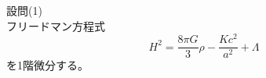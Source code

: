 \documentclass[unicode,a4paper,10pt]{ltjsarticle}
\begin{document}
\maketitle

設問(1)\\

フリードマン方程式
\begin{equation}
  H^2
  =
  \frac{8\pi G}{3}\rho
  -
  \frac{Kc^2}{a^2}
  +
  \Lambda
\end{equation}
を1階微分する。
\end{document}
